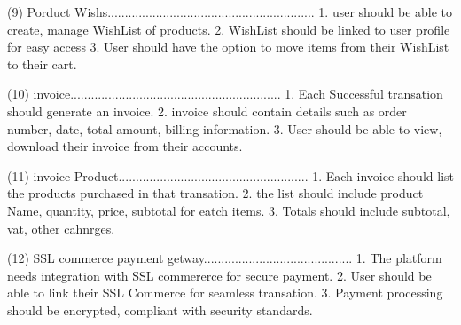 (9) Porduct Wishs............................................................
    1. user should be able to create, manage WishList of products.
    2. WishList should be linked to user profile for easy access
    3. User should have the option to move items from their WishList to their cart.

(10) invoice.............................................................
     1. Each Successful transation should generate an invoice.
     2. invoice should contain details such as order number, date, total amount, billing information.
     3. User should be able to view, download their invoice from their accounts.

(11) invoice Product.......................................................
     1. Each invoice should list the products purchased in that transation.
     2. the list should include product Name, quantity, price, subtotal for eatch items.
     3. Totals should include subtotal, vat, other cahnrges.

(12) SSL commerce payment getway...........................................
     1. The platform needs integration with SSL commererce for secure payment.
     2. User should be able to link their SSL Commerce for seamless transation.
     3. Payment processing should be encrypted, compliant with security standards.